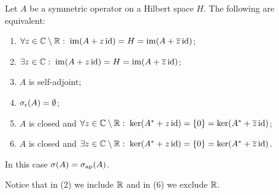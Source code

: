 \begin{proposition} \label{rangeSelfAdjointCriterion}
Let $A$ be a symmetric operator on a Hilbert space $H$. The following are equivalent:
\begin{enumerate}
\item $\forall z \in \mathbb{C}\setminus\mathbb{R}: \; \operatorname{im}(A+z\operatorname{id}) = H = \operatorname{im}(A+\overline{z}\operatorname{id})$;
\item $\exists z \in \mathbb{C}: \; \operatorname{im}(A+z\operatorname{id}) = H = \operatorname{im}(A+\overline{z}\operatorname{id})$;
\item $A$ is self-adjoint;
\item $\sigma_\text{r}(A) = \emptyset$;
\item $A$ is closed and $\forall z \in \mathbb{C}\setminus \mathbb{R}: \; \ker(A^*+z\operatorname{id}) = \{0\} = \ker(A^*+\overline{z}\operatorname{id})$;
\item $A$ is closed and $\exists z \in \mathbb{C}\setminus \mathbb{R}: \; \ker(A^*+z\operatorname{id}) = \{0\} = \ker(A^*+\overline{z}\operatorname{id})$.
\end{enumerate}
In this case $\sigma(A) = \sigma_\text{ap}(A)$.
\end{proposition}
Notice that in (2) we include $\mathbb{R}$ and in (6) we exclude $\mathbb{R}$.

